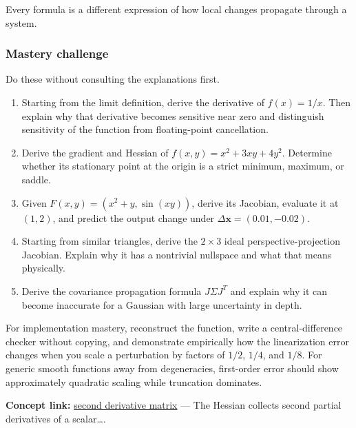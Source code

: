 Every formula is a different expression of how local changes propagate through a system.

\subsubsection{Mastery challenge}\label{02-foundations-ii-ch021-mastery-challenge}

\hypertarget{02-foundations-ii-ch021-mastery-challenge}{}

Do these without consulting the explanations first.

\begin{enumerate}
\def\labelenumi{\arabic{enumi}.}
\tightlist
\item
  Starting from the limit definition, derive the derivative of \(f(x)=1/x\). Then explain why that derivative becomes sensitive near zero and distinguish sensitivity of the function from floating-point cancellation.
\item
  Derive the gradient and Hessian of \(f(x,y)=x^2+3xy+4y^2\). Determine whether its stationary point at the origin is a strict minimum, maximum, or saddle.
\item
  Given \(F(x,y)=(x^2+y,\sin(xy))\), derive its Jacobian, evaluate it at \((1,2)\), and predict the output change under \(\Delta\mathbf x=(0.01,-0.02)\).
\item
  Starting from similar triangles, derive the \(2\times3\) ideal perspective-projection Jacobian. Explain why it has a nontrivial nullspace and what that means physically.
\item
  Derive the covariance propagation formula \(J\Sigma J^T\) and explain why it can become inaccurate for a Gaussian with large uncertainty in depth.
\end{enumerate}

For implementation mastery, reconstruct the  function, write a central-difference checker without copying, and demonstrate empirically how the linearization error changes when you scale a perturbation by factors of \(1/2\), \(1/4\), and \(1/8\). For generic smooth functions away from degeneracies, first-order error should show approximately quadratic scaling while truncation dominates.

\textbf{Concept link:} \hyperref[02-foundations-ii-ch021-jacobians-curvature-and-local-approximation]{second derivative matrix} --- The Hessian collects second partial derivatives of a scalar\ldots.

